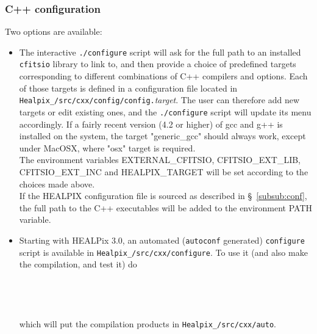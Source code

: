 \documentclass[12pt,twoside]{article}
\begin{document}
\subsubsection{C++ configuration}
\label{sec:cpp_config}
Two options are available:
\begin{itemize}
\item The interactive {\tt ./configure} script will 
ask for the full path to an installed {\tt cfitsio} library to link to, and then provide a choice of
predefined targets corresponding to different combinations of C++ compilers and
options. Each of those targets is defined in a configuration file located in
{\tt Healpix\_\hpxversion/src/cxx/config/config.}{\em target}.
The user can therefore add new targets or edit existing ones, and the
{\tt ./configure} script will update its menu accordingly.
If a fairly recent version
(4.2 or higher) of gcc and g++ is installed on the system, the target
"generic\_gcc" should always work, except under MacOSX, where "osx" target is
required.  \\
The environment variables EXTERNAL\_CFITSIO, 
CFITSIO\_EXT\_LIB, 
CFITSIO\_EXT\_INC and 
HEALPIX\_TARGET 
will be set according to the choices made above.
\\
If the HEALPIX configuration file is sourced as described in \S~\ref{subsub:conf}, the full path to the C++
executables will be added to the environment PATH variable.

\item Starting with HEALPix 3.0, an automated ({\tt autoconf} generated) {\tt configure} script is 
available in {\tt Healpix\_\hpxversion/src/cxx/configure}. To use it (and also make the compilation, and test it) 
do\\
\\
\\
\\
\\
which will put the compilation products in {\tt Healpix\_\hpxversion/src/cxx/auto}.
\end{itemize}
\end{document}
